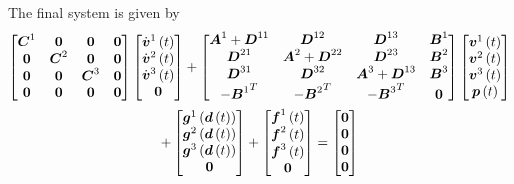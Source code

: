 The final system is given by
\begin{multline}
  \begin{bmatrix}
    \matr{C}^{1} & \matr{0} & \matr{0} & \matr{0} \\
    \matr{0} & \matr{C}^{2} & \matr{0} & \matr{0} \\
    \matr{0} & \matr{0} & \matr{C}^{3} & \matr{0} \\
    \matr{0} & \matr{0} & \matr{0} & \matr{0}
  \end{bmatrix}\begin{bmatrix}
      \fnof{\dot{\vectr{v}}^{1}}{t} \\
      \fnof{\dot{\vectr{v}}^{2}}{t} \\
      \fnof{\dot{\vectr{v}}^{3}}{t} \\
      \vectr{0}
  \end{bmatrix}+\begin{bmatrix}
     \matr{A}^{1}+\matr{D}^{11} & \matr{D}^{12} & \matr{D}^{13} & \matr{B}^{1}\\
     \matr{D}^{21} & \matr{A}^{2}+\matr{D}^{22} & \matr{D}^{23} & \matr{B}^{2}\\
     \matr{D}^{31} & \matr{D}^{32} & \matr{A}^{3}+\matr{D}^{13} & \matr{B}^{3}\\
     -\transpose{\matr{B}^{1}} & -\transpose{\matr{B}^{2}} & -\transpose{\matr{B}^{3}} & \matr{0}
  \end{bmatrix}\begin{bmatrix}
    \fnof{\vectr{v}^{1}}{t} \\
    \fnof{\vectr{v}^{2}}{t} \\
    \fnof{\vectr{v}^{3}}{t} \\
    \fnof{\vectr{p}}{t}
  \end{bmatrix}\\
  +\begin{bmatrix}
    \fnof{\vectr{g}^{1}}{\fnof{\vectr{d}}{t}} \\
    \fnof{\vectr{g}^{2}}{\fnof{\vectr{d}}{t}} \\
    \fnof{\vectr{g}^{3}}{\fnof{\vectr{d}}{t}} \\
    \vectr{0}
  \end{bmatrix}+\begin{bmatrix}
    \fnof{\vectr{f}^{1}}{t} \\
    \fnof{\vectr{f}^{2}}{t} \\
    \fnof{\vectr{f}^{3}}{t} \\
    \vectr{0}
  \end{bmatrix}=\begin{bmatrix}
  \vectr{0} \\
  \vectr{0} \\
  \vectr{0} \\
  \vectr{0}
  \end{bmatrix}
\end{multline}

